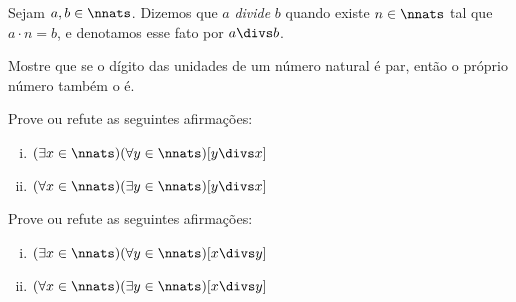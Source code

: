 \begin{definition}
Sejam $a,b \in \nnats$. Dizemos que $a$ \textit{divide} $b$ quando existe $n \in \nnats$ tal que $a \cdot n = b$, e denotamos esse fato por $a \divs b$.
\end{definition}

\begin{exercise}
%
Mostre que se o dígito das unidades de um número natural é par, então o próprio número também o é.
\end{exercise}

\begin{exercise}
%
Prove ou refute as seguintes afirmações:

\begin{enumerate}[(i)]
\item $(\exists x \in \nnats)( \forall y \in \nnats)[ y \divs x]$
\item $(\forall x \in \nnats)( \exists y \in \nnats)[ y \divs x]$
\end{enumerate}

\begin{homework}
%
Prove ou refute as seguintes afirmações:
\begin{enumerate}[(i)]
\item $(\exists x \in \nnats)( \forall y \in \nnats)[ x \divs y]$
\item $(\forall x \in \nnats)( \exists y \in \nnats)[ x \divs y]$
\end{enumerate}
\end{homework}

\end{exercise}